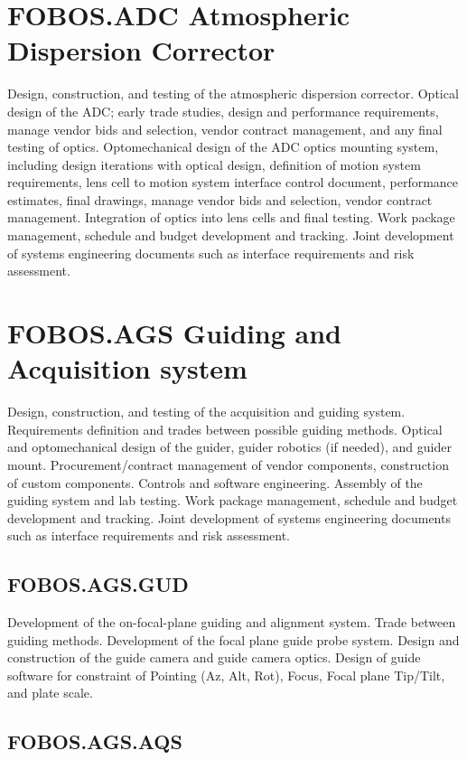 \documentclass[oneside,11pt]{amsart}
\begin{document}
\section{FOBOS.ADC Atmospheric Dispersion Corrector}

Design, construction, and testing of the atmospheric dispersion
corrector. Optical design of the ADC; early trade studies, design and
performance requirements, manage vendor bids and selection, vendor
contract management, and any final testing of optics. Optomechanical
design of the ADC optics mounting system, including design iterations
with optical design, definition of motion system requirements, lens
cell to motion system interface control document, performance
estimates, final drawings, manage vendor bids and selection, vendor
contract management. Integration of optics into lens cells and final
testing. Work package management, schedule and budget development and
tracking. Joint development of systems engineering documents such as
interface requirements and risk assessment.

\section{FOBOS.AGS Guiding and Acquisition system}

Design, construction, and testing of the acquisition and guiding
system. Requirements definition and trades between possible guiding
methods. Optical and optomechanical design of the guider, guider
robotics (if needed), and guider mount. Procurement/contract
management of vendor components, construction of custom components.
Controls and software engineering. Assembly of the guiding system and
lab testing. Work package management, schedule and budget development
and tracking. Joint development of systems engineering documents such
as interface requirements and risk assessment.

\subsection{FOBOS.AGS.GUD}

Development of the on-focal-plane guiding and alignment system. Trade
between guiding methods. Development of the focal plane guide probe
system. Design and construction of the guide camera and guide camera
optics. Design of guide software for constraint of Pointing (Az, Alt,
Rot), Focus, Focal plane Tip/Tilt, and plate scale.

\subsection{FOBOS.AGS.AQS}
\end{document}
